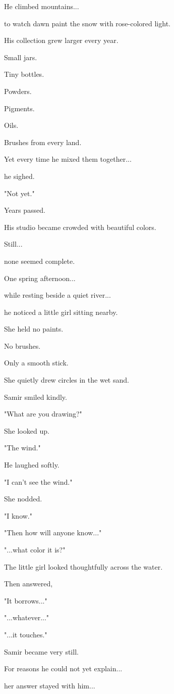 \documentclass[12pt,openany]{book}
\begin{document}
He climbed mountains...

to watch dawn paint the snow with rose-colored light.

His collection grew larger every year.

Small jars.

Tiny bottles.

Powders.

Pigments.

Oils.

Brushes from every land.

Yet every time he mixed them together...

he sighed.

"Not yet."

Years passed.

His studio became crowded with beautiful colors.

Still...

none seemed complete.

One spring afternoon...

while resting beside a quiet river...

he noticed a little girl sitting nearby.

She held no paints.

No brushes.

Only a smooth stick.

She quietly drew circles in the wet sand.

Samir smiled kindly.

"What are you drawing?"

She looked up.

"The wind."

He laughed softly.

"I can't see the wind."

She nodded.

"I know."

"Then how will anyone know..."

"...what color it is?"

The little girl looked thoughtfully across the water.

Then answered,

"It borrows..."

"...whatever..."

"...it touches."

Samir became very still.

For reasons he could not yet explain...

her answer stayed with him...
\end{document}
